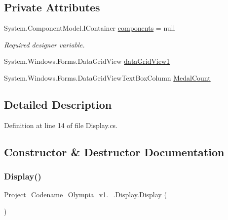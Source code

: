 \subsection*{Private Attributes}
\begin{DoxyCompactItemize}
\item 
System.\+Component\+Model.\+I\+Container \hyperlink{classProject__Codename__Olympia__v1_1_1__0_1_1Display_a8db0d7c7e6ede7ddc363012ea5667e9d}{components} = null
\begin{DoxyCompactList}\small\item\em Required designer variable. \end{DoxyCompactList}\item 
System.\+Windows.\+Forms.\+Data\+Grid\+View \hyperlink{classProject__Codename__Olympia__v1_1_1__0_1_1Display_aca140105ad4ea07a2a936ce8e7302da5}{data\+Grid\+View1}
\item 
System.\+Windows.\+Forms.\+Data\+Grid\+View\+Text\+Box\+Column \hyperlink{classProject__Codename__Olympia__v1_1_1__0_1_1Display_a8302137e094ab0b4e00fc3f623229292}{Medal\+Count}
\end{DoxyCompactItemize}


\subsection{Detailed Description}


Definition at line 14 of file Display.\+cs.



\subsection{Constructor \& Destructor Documentation}
\mbox{\label{classProject__Codename__Olympia__v1_1_1__0_1_1Display_a5b82498205350df8a82355b725186908}} 
\subsubsection{\texorpdfstring{Display()}{Display()}}
{\footnotesize\ttfamily Project\+\_\+\+Codename\+\_\+\+Olympia\+\_\+v1.\+\_.\+Display.\+Display (\begin{DoxyParamCaption}{ }\end{DoxyParamCaption})\hspace{0.3cm}{\ttfamily [inline]}}



